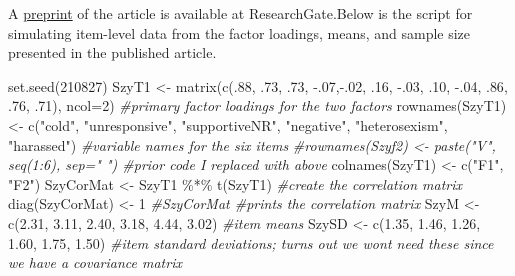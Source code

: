 \documentclass[
  english,
]{book}
\newenvironment{Shaded}{\begin{snugshade}}{\end{snugshade}}
\newcommand{\AttributeTok}[1]{\textcolor[rgb]{0.77,0.63,0.00}{#1}}
\newcommand{\CommentTok}[1]{\textcolor[rgb]{0.56,0.35,0.01}{\textit{#1}}}
\newcommand{\DecValTok}[1]{\textcolor[rgb]{0.00,0.00,0.81}{#1}}
\newcommand{\FloatTok}[1]{\textcolor[rgb]{0.00,0.00,0.81}{#1}}
\newcommand{\FunctionTok}[1]{\textcolor[rgb]{0.00,0.00,0.00}{#1}}
\newcommand{\NormalTok}[1]{#1}
\newcommand{\OtherTok}[1]{\textcolor[rgb]{0.56,0.35,0.01}{#1}}
\newcommand{\SpecialCharTok}[1]{\textcolor[rgb]{0.00,0.00,0.00}{#1}}
\newcommand{\StringTok}[1]{\textcolor[rgb]{0.31,0.60,0.02}{#1}}
\begin{document}
A \href{https://www.researchgate.net/publication/332062781_Perceptions_of_the_LGBTQ_College_Campus_Climate_Scale_Development_and_Psychometric_Evaluation/link/5ca0bef945851506d7377da7/download}{preprint} of the article is available at ResearchGate.Below is the script for simulating item-level data from the factor loadings, means, and sample size presented in the published article.

\begin{Shaded}
\begin{Highlighting}[]
\FunctionTok{set.seed}\NormalTok{(}\DecValTok{210827}\NormalTok{)}
\NormalTok{SzyT1 }\OtherTok{\textless{}{-}} \FunctionTok{matrix}\NormalTok{(}\FunctionTok{c}\NormalTok{(.}\DecValTok{88}\NormalTok{, .}\DecValTok{73}\NormalTok{, .}\DecValTok{73}\NormalTok{, }\SpecialCharTok{{-}}\NormalTok{.}\DecValTok{07}\NormalTok{,}\SpecialCharTok{{-}}\NormalTok{.}\DecValTok{02}\NormalTok{, .}\DecValTok{16}\NormalTok{, }\SpecialCharTok{{-}}\NormalTok{.}\DecValTok{03}\NormalTok{, .}\DecValTok{10}\NormalTok{, }\SpecialCharTok{{-}}\NormalTok{.}\DecValTok{04}\NormalTok{, .}\DecValTok{86}\NormalTok{, .}\DecValTok{76}\NormalTok{, .}\DecValTok{71}\NormalTok{), }\AttributeTok{ncol=}\DecValTok{2}\NormalTok{) }\CommentTok{\#primary factor loadings for the two factors}
\FunctionTok{rownames}\NormalTok{(SzyT1) }\OtherTok{\textless{}{-}} \FunctionTok{c}\NormalTok{(}\StringTok{"cold"}\NormalTok{, }\StringTok{"unresponsive"}\NormalTok{, }\StringTok{"supportiveNR"}\NormalTok{, }\StringTok{"negative"}\NormalTok{, }\StringTok{"heterosexism"}\NormalTok{, }\StringTok{"harassed"}\NormalTok{) }\CommentTok{\#variable names for the six items}
\CommentTok{\#rownames(Szyf2) \textless{}{-} paste("V", seq(1:6), sep=" ") \#prior code I replaced with above}
\FunctionTok{colnames}\NormalTok{(SzyT1) }\OtherTok{\textless{}{-}} \FunctionTok{c}\NormalTok{(}\StringTok{"F1"}\NormalTok{, }\StringTok{"F2"}\NormalTok{)}
\NormalTok{SzyCorMat }\OtherTok{\textless{}{-}}\NormalTok{ SzyT1 }\SpecialCharTok{\%*\%} \FunctionTok{t}\NormalTok{(SzyT1) }\CommentTok{\#create the correlation matrix}
\FunctionTok{diag}\NormalTok{(SzyCorMat) }\OtherTok{\textless{}{-}} \DecValTok{1}
\CommentTok{\#SzyCorMat \#prints the correlation matrix}
\NormalTok{SzyM }\OtherTok{\textless{}{-}} \FunctionTok{c}\NormalTok{(}\FloatTok{2.31}\NormalTok{, }\FloatTok{3.11}\NormalTok{, }\FloatTok{2.40}\NormalTok{, }\FloatTok{3.18}\NormalTok{, }\FloatTok{4.44}\NormalTok{, }\FloatTok{3.02}\NormalTok{) }\CommentTok{\#item means}
\NormalTok{SzySD }\OtherTok{\textless{}{-}} \FunctionTok{c}\NormalTok{(}\FloatTok{1.35}\NormalTok{, }\FloatTok{1.46}\NormalTok{, }\FloatTok{1.26}\NormalTok{, }\FloatTok{1.60}\NormalTok{, }\FloatTok{1.75}\NormalTok{, }\FloatTok{1.50}\NormalTok{) }\CommentTok{\#item standard deviations; turns out we won\textquotesingle{}t need these since we have a covariance matrix}

\end{Highlighting}
\end{Shaded}
\end{document}
